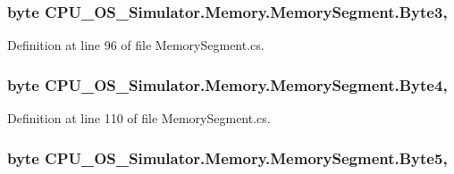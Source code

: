 \subsubsection[{Byte3}]{\setlength{\rightskip}{0pt plus 5cm}byte C\+P\+U\+\_\+\+O\+S\+\_\+\+Simulator.\+Memory.\+Memory\+Segment.\+Byte3\hspace{0.3cm}{\ttfamily [get]}, {\ttfamily [set]}}\label{class_c_p_u___o_s___simulator_1_1_memory_1_1_memory_segment_aa8c335116132ff754331eadb12355247}


Definition at line 96 of file Memory\+Segment.\+cs.

\hypertarget{class_c_p_u___o_s___simulator_1_1_memory_1_1_memory_segment_acc659c001dde3c6f6b0875df933b5bec}{}
\subsubsection[{Byte4}]{\setlength{\rightskip}{0pt plus 5cm}byte C\+P\+U\+\_\+\+O\+S\+\_\+\+Simulator.\+Memory.\+Memory\+Segment.\+Byte4\hspace{0.3cm}{\ttfamily [get]}, {\ttfamily [set]}}\label{class_c_p_u___o_s___simulator_1_1_memory_1_1_memory_segment_acc659c001dde3c6f6b0875df933b5bec}


Definition at line 110 of file Memory\+Segment.\+cs.

\hypertarget{class_c_p_u___o_s___simulator_1_1_memory_1_1_memory_segment_a8ef49453e406cd41eacc4e2ef16a8420}{}
\subsubsection[{Byte5}]{\setlength{\rightskip}{0pt plus 5cm}byte C\+P\+U\+\_\+\+O\+S\+\_\+\+Simulator.\+Memory.\+Memory\+Segment.\+Byte5\hspace{0.3cm}{\ttfamily [get]}, {\ttfamily [set]}}\label{class_c_p_u___o_s___simulator_1_1_memory_1_1_memory_segment_a8ef49453e406cd41eacc4e2ef16a8420}



